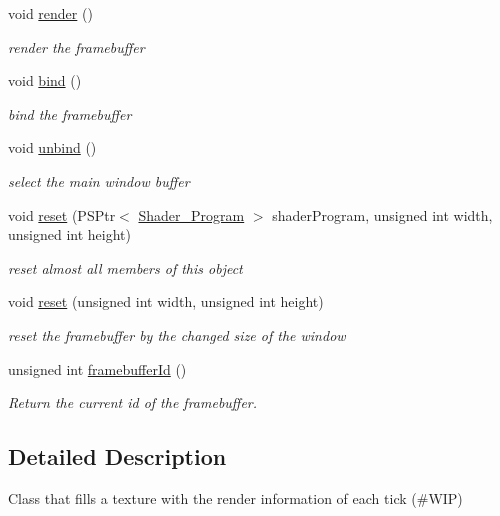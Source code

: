 \begin{DoxyCompactItemize}
void \mbox{\hyperlink{classprz_1_1_framebuffer_a2db3bf6a0337607f5627dda5bd167987}{render}} ()
\begin{DoxyCompactList}\small\item\em render the framebuffer \end{DoxyCompactList}\item 
void \mbox{\hyperlink{classprz_1_1_framebuffer_acc266facb2c332886cd396f42f51fe7d}{bind}} ()
\begin{DoxyCompactList}\small\item\em bind the framebuffer \end{DoxyCompactList}\item 
void \mbox{\hyperlink{classprz_1_1_framebuffer_a6c03b79bd901ab90cfe89fdf7141d61d}{unbind}} ()
\begin{DoxyCompactList}\small\item\em select the main window buffer \end{DoxyCompactList}\item 
void \mbox{\hyperlink{classprz_1_1_framebuffer_aa3c0cee259022d2c0c09f50cba65b538}{reset}} (P\+S\+Ptr$<$ \mbox{\hyperlink{classprz_1_1_shader___program}{Shader\+\_\+\+Program}} $>$ shader\+Program, unsigned int width, unsigned int height)
\begin{DoxyCompactList}\small\item\em reset almost all members of this object \end{DoxyCompactList}\item 
void \mbox{\hyperlink{classprz_1_1_framebuffer_a6b63a1bfbeed632ad271c5bc735d307a}{reset}} (unsigned int width, unsigned int height)
\begin{DoxyCompactList}\small\item\em reset the framebuffer by the changed size of the window \end{DoxyCompactList}\item 
unsigned int \mbox{\hyperlink{classprz_1_1_framebuffer_aca934dc2ffb0798e04faf37c8df8d6b1}{framebuffer\+Id}} ()
\begin{DoxyCompactList}\small\item\em Return the current id of the framebuffer. \end{DoxyCompactList}\end{DoxyCompactItemize}


\subsection{Detailed Description}
Class that fills a texture with the render information of each tick (\#\+W\+IP) 




